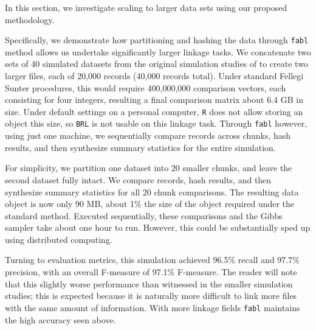 \documentclass[12pt,letterpaper]{article}
\newcommand{\1}[1]{\mathbb{I}\!\left[#1\right]} %
\begin{document}
In this section, we investigate scaling to larger data sets using our proposed methodology. 
 
Specifically, we demonstrate how partitioning and hashing the data through \texttt{fabl} method allows us undertake significantly larger linkage tasks. We concatenate two sets of 40 simulated datasets from the original simulation studies of \cite{} to create two larger files, each of 20,000 records (40,000 records total). Under standard Fellegi Sunter procedures, this would require 400,000,000 comparison vectors, each consisting for four integers, resulting a final comparison matrix about 6.4 GB in size. Under default settings on a personal computer, \texttt{R} does not allow storing an object this size, so \texttt{BRL} is not usable on this linkage task. Through \texttt{fabl} however, using just one machine, we sequentially compare records across chunks, hash results, and then synthesize summary statistics for the entire simulation.  
 
For simplicity, we partition one dataset into 20 smaller chunks, and leave the second dataset fully intact. We compare records, hash results, and then synthesize summary statistics for all 20 chunk comparisons. The resulting data object is now only 90 MB, about 1\% the size of the object required under the standard method. Executed sequentially, these comparisons and the Gibbs sampler take about one hour to run. However, this could be substantially sped up using distributed computing.

Turning to evaluation metrics, this simulation achieved 96.5\% recall and 97.7\% precision, with an overall F-measure of 97.1\% F-measure. The reader will note that this slightly worse performance than witnessed in the smaller simulation studies; this is expected because it is naturally more difficult to link more files with the same amount of information. With more linkage fields \texttt{fabl} maintains the high accuracy seen above. 

\end{document}
